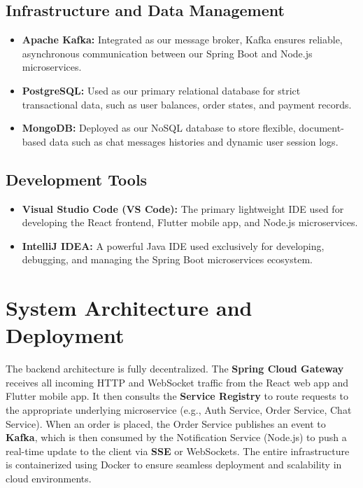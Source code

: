 \subsection{Infrastructure and Data Management}
\begin{itemize}
    \item \textbf{Apache Kafka:} Integrated as our message broker, Kafka ensures reliable, asynchronous communication between our Spring Boot and Node.js microservices.
    \item \textbf{PostgreSQL:} Used as our primary relational database for strict transactional data, such as user balances, order states, and payment records.
    \item \textbf{MongoDB:} Deployed as our NoSQL database to store flexible, document-based data such as chat messages histories and dynamic user session logs.
\end{itemize}

\subsection{Development Tools}
\begin{itemize}
    \item \textbf{Visual Studio Code (VS Code):} The primary lightweight IDE used for developing the React frontend, Flutter mobile app, and Node.js microservices.
    \item \textbf{IntelliJ IDEA:} A powerful Java IDE used exclusively for developing, debugging, and managing the Spring Boot microservices ecosystem.
\end{itemize}

\section{System Architecture and Deployment}
The backend architecture is fully decentralized. The \textbf{Spring Cloud Gateway} receives all incoming HTTP and WebSocket traffic from the React web app and Flutter mobile app. It then consults the \textbf{Service Registry} to route requests to the appropriate underlying microservice (e.g., Auth Service, Order Service, Chat Service). When an order is placed, the Order Service publishes an event to \textbf{Kafka}, which is then consumed by the Notification Service (Node.js) to push a real-time update to the client via \textbf{SSE} or WebSockets. The entire infrastructure is containerized using Docker to ensure seamless deployment and scalability in cloud environments.

